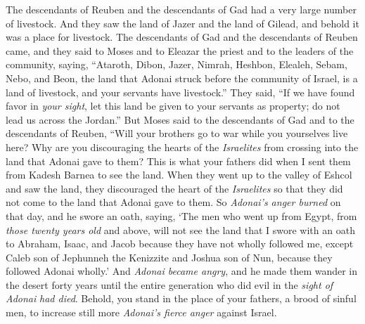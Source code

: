 \begin{biblechapter} %
 The descendants of Reuben and the descendants of Gad had a very large number of livestock. And they saw the land of Jazer and the land of Gilead, and behold it was a place for livestock.
\verse The descendants of Gad and the descendants of Reuben came, and they said to Moses and to Eleazar the priest and to the leaders of the community, saying,
\verse “Ataroth, Dibon, Jazer, Nimrah, Heshbon, Elealeh, Sebam, Nebo, and Beon,
\verse the land that Adonai struck before the community of Israel, is a land of livestock, and your servants have livestock.”
\verse They said, “If we have found favor in \textit{your sight}, let this land be given to your servants as property; do not lead us across the Jordan.”
\verse But Moses said to the descendants of Gad and to the descendants of Reuben, “Will your brothers go to war while you yourselves live here?
\verse Why are you discouraging the hearts of the \textit{Israelites} from crossing into the land that Adonai gave to them?
\verse This is what your fathers did when I sent them from Kadesh Barnea to see the land.
\verse When they went up to the valley of Eshcol and saw the land, they discouraged the heart of the \textit{Israelites} so that they did not come to the land that Adonai gave to them.
\verse So \textit{Adonai’s anger burned} on that day, and he swore an oath, saying,
\verse ‘The men who went up from Egypt, from \textit{those twenty years old} and above, will not see the land that I swore with an oath to Abraham, Isaac, and Jacob because they have not wholly followed me,
\verse except Caleb son of Jephunneh the Kenizzite and Joshua son of Nun, because they followed Adonai wholly.’
\verse And \textit{Adonai became angry}, and he made them wander in the desert forty years until the entire generation who did evil in the \textit{sight of Adonai} \textit{had died}.
\verse Behold, you stand in the place of your fathers, a brood of sinful men, to increase still more \textit{Adonai’s fierce anger} against Israel.

\end{biblechapter}
